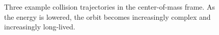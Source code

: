 \documentclass[%
 reprint,
 amsmath,amssymb,
 aps,
 nofootinbib
]{revtex4-1}
\begin{document}
\begin{figure}[htp]

\caption{Three example collision trajectories in the center-of-mass frame. As the energy is lowered, the orbit becomes increasingly complex and increasingly long-lived.}
\label{fig:collisioncomplexes}
\end{figure}
\end{document}
